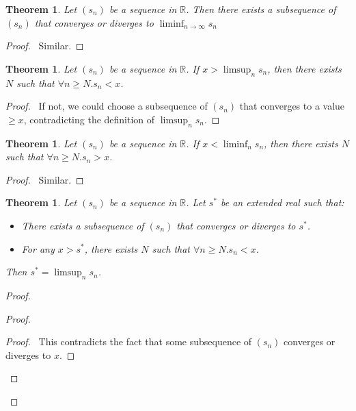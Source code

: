 \documentclass{book}
\let\qed\relax
\newtheorem{thm}[prop]{Theorem}
\theoremstyle{definition}
\begin{document}
\begin{thm}
Let $(s_n)$ be a sequence in $\mathbb{R}$. Then there exists a subsequence of $(s_n)$ that converges or diverges to $\liminf_{n \rightarrow \infty} s_n$
\end{thm}

\begin{proof}
\pf\ Similar. \qed
\end{proof}

\begin{thm}
\label{thm:greater_than_limsup}
Let $(s_n)$ be a sequence in $\mathbb{R}$. If $x > \limsup_n s_n$, then there exists $N$ such that $\forall n \geq N. s_n < x$.
\end{thm}

\begin{proof}
\pf\ If not, we could choose a subsequence of $(s_n)$ that converges to a value $\geq x$, contradicting the definition of $\limsup_n s_n$. \qed
\end{proof}

\begin{thm}
Let $(s_n)$ be a sequence in $\mathbb{R}$. If $x < \liminf_n s_n$, then there exists $N$ such that $\forall n \geq N. s_n > x$.
\end{thm}

\begin{proof}
\pf\ Similar. \qed
\end{proof}

\begin{thm}
\label{thm:limsup}
Let $(s_n)$ be a sequence in $\mathbb{R}$. Let $s^*$ be an extended real such that:
\begin{itemize}
\item There exists a subsequence of $(s_n)$ that converges or diverges to $s^*$.
\item For any $x > s^*$, there exists $N$ such that $\forall n \geq N. s_n < x$.
\end{itemize}
Then $s^* = \limsup_n s_n$.
\end{thm}

\begin{proof}
\pf
{}
\begin{proof}
	\qedstep
	\begin{proof}
		\pf\ This contradicts the fact that some subsequence of $(s_n)$ converges or diverges to $x$.
	\end{proof}
\end{proof}
\qed
\end{proof}
\end{document}
